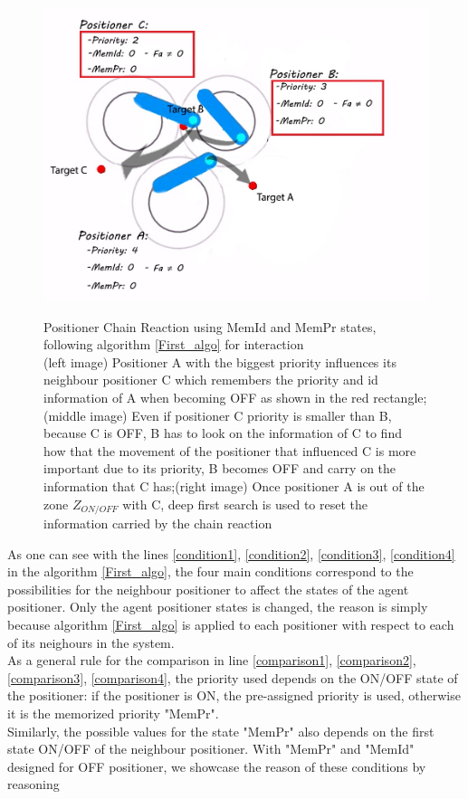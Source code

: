 \documentclass[]{spie}  %
\begin{document}
\begin{figure}[H]
\begin{minipage}[t]{5.4cm}
 			\includegraphics[scale=0.3]{images/ID_PR2.jpg}
 			\label{ID_PR2}
 		\end{minipage}
 		\caption{\centering Positioner Chain Reaction using MemId and MemPr states, following algorithm \ref{First_algo} for interaction\\
 			(left image) Positioner A with the biggest priority influences its neighbour positioner C which remembers the priority and id information of A when becoming OFF as shown in the red rectangle; (middle image) Even if positioner C priority is smaller than B, because C is OFF, B has to look on the information of C to find how that the movement of the positioner that influenced C is more important due to its priority, B becomes OFF and carry on the information that C has;(right image) Once positioner A is out of the zone $Z_{ON/OFF}$ with C, deep first search is used to reset the information carried by the chain reaction }
 		\label{ID_PR}
 	\end{figure}
	 As one can see with the lines \ref{condition1}, \ref{condition2}, \ref{condition3}, \ref{condition4} in the algorithm \ref{First_algo}, the four main conditions correspond to the possibilities for the neighbour positioner to affect the states of the agent positioner. Only the agent positioner states is changed, the reason is simply because algorithm \ref{First_algo} is applied to each positioner with respect to each of its neighours in the system.\\
	As a general rule for the comparison in line \ref{comparison1}, \ref{comparison2}, \ref{comparison3}, \ref{comparison4}, the priority used depends on the ON/OFF state of the positioner: if the positioner is ON, the pre-assigned priority is used, otherwise it is the memorized priority "MemPr". \\
	Similarly, the possible values for the state "MemPr" also depends on the first state ON/OFF of the neighbour positioner. 	
	With "MemPr" and "MemId" designed for OFF positioner, we showcase the reason of these conditions by reasoning 
	
\end{document}
